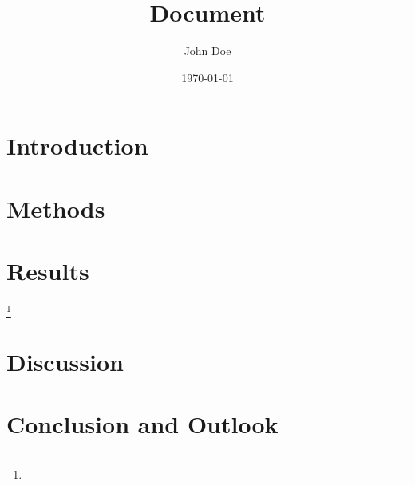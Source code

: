 \documentclass[10pt, a4paper, twoside]{scrartcl}
\title{Document}
\author{John Doe}
\date{\today}
\begin{document}
\maketitle

\begin{abstract}
	\blindtext
\end{abstract}

\section{Introduction}


\blindtext\cite{schurmann_konstruieren_2007}

\blindtext\cite{koller_prinziplosungen_1998}

\section{Methods}

\Blindtext

\section{Results}

\Blindtext\footnote{\blindtext}

\section{Discussion}

\Blindtext\cite{wachter_angewandter_2017}

\section{Conclusion and Outlook}

\blindtext


\appendix

\printbibliography
\end{document}
